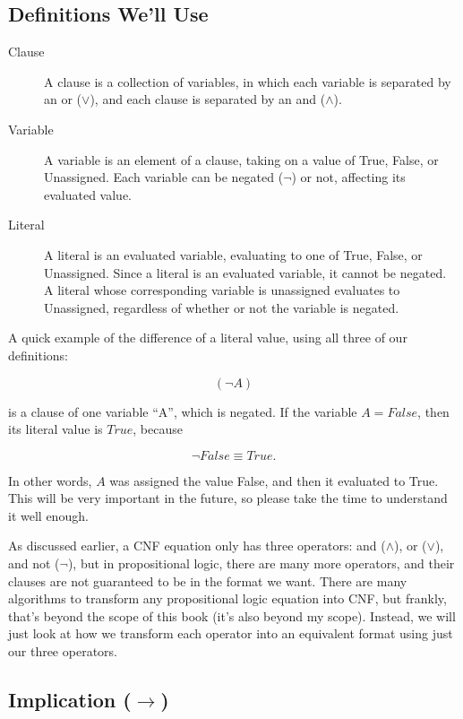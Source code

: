 \documentclass[oneside]{book}
\begin{document}
\subsection*{Definitions We'll Use}

\begin{description}
    \item[Clause] A clause is a collection of variables, in which each variable is
    separated by an or ($\lor$), and each clause is separated by an and
    ($\land$).

    \item[Variable] A variable is an element of a clause, taking on a value of
    True, False, or Unassigned. Each variable can be negated ($\neg$) or not,
    affecting its evaluated value.

    \item[Literal] A literal is an evaluated variable, evaluating to one of True,
    False, or Unassigned. Since a literal is an evaluated variable, it cannot be
    negated. A literal whose corresponding variable is unassigned evaluates to
    Unassigned, regardless of whether or not the variable is negated.
\end{description}

A quick example of the difference of a literal value, using all three of our
definitions:

\[
(\neg A)
\]

is a clause of one variable ``A'', which is negated. If the variable
$A=False$, then its literal value is $True$, because

\[
\neg False \equiv True.
\]

In other words, $A$ was assigned the value False, and then it evaluated to
True. This will be very important in the future, so please take the time to
understand it well enough.

As discussed earlier, a CNF equation only has three operators: and ($\land$),
or ($\lor$), and not ($\neg$), but in propositional logic, there are many more
operators, and their clauses are not guaranteed to be in the format we want.
There are many algorithms to transform any propositional logic equation into
CNF, but frankly, that's beyond the scope of this book (it's also beyond my
scope). Instead, we will just look at how we transform each operator into an
equivalent format using just our three operators.

\subsection*{Implication ($\rightarrow$)}
\end{document}
